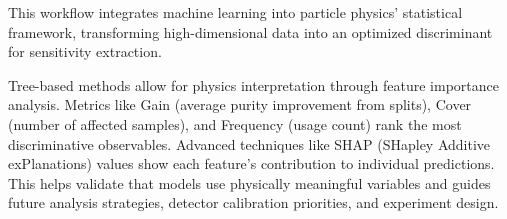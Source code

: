 This workflow integrates machine learning into particle physics' statistical framework, transforming high-dimensional data into an optimized discriminant for sensitivity extraction.


Tree-based methods allow for physics interpretation through feature importance analysis. Metrics like Gain (average purity improvement from splits), Cover (number of affected samples), and Frequency (usage count) rank the most discriminative observables. Advanced techniques like SHAP (SHapley Additive exPlanations) values show each feature's contribution to individual predictions. This helps validate that models use physically meaningful variables and guides future analysis strategies, detector calibration priorities, and experiment design.
